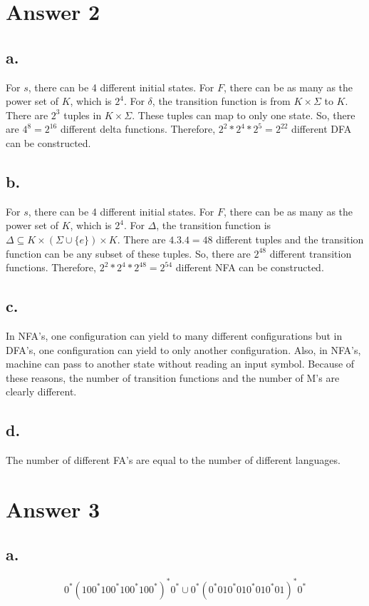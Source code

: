 \documentclass[12pt]{article}
\begin{document}
\section*{Answer 2}

\subsection*{a.}
For $s$, there can be 4 different initial states. For $F$, there can be as many as the power set of $K$, which is $2^4$. For $\delta$, the transition function is from $K \times \Sigma$ to $K$. There are $2^3$ tuples in $K \times \Sigma$. These tuples can map to only one state.  So, there are $4^8=2^{16}$ different delta functions. Therefore, $2^2*2^4*2^5=2^{22}$ different DFA can be constructed.
\subsection*{b.}
For $s$, there can be 4 different initial states. For $F$, there can be as many as the power set of $K$, which is $2^4$. For $\Delta$, the transition function is $\Delta \subseteq K \times (\Sigma \cup \{e\})\times K$. There are $4.3.4=48$ different tuples and the transition function can be any subset of these tuples. So, there are $2^{48}$ different transition functions. Therefore, $2^2*2^4*2^{48}=2^{54}$ different NFA can be constructed.
\subsection*{c.}
In NFA's, one configuration can yield to many different configurations but in DFA's, one configuration can yield to only another configuration. Also, in NFA's, machine can pass to another state without reading an input symbol. Because of these reasons, the number of transition functions and the number of M's are clearly different. 
\subsection*{d.}
The number of different FA's are equal to the number of different languages.

\section*{Answer 3}


\subsection*{a.}
$$0^*(100^*100^*100^*100^*)^*0^*\cup 0^*(0^*010^*010^*010^*01)^*0^*$$
\end{document}
